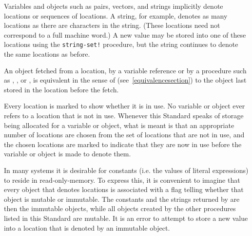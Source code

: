 Variables and objects such as pairs, vectors, and strings implicitly
denote locations or sequences of locations.  A
string, for example, denotes as many locations as there are characters
in the string.  (These locations need not correspond to a full machine
word.) A new value may be stored into one of these locations using the
{\tt string-set!} procedure, but the string continues to denote the
same locations as before.
  
An object fetched from a location, by a variable reference or by
a procedure such as , , or , is
equivalent in the sense of  (see~\ref{equivalencesection})
to the object last stored in the location before the fetch.

Every location is marked to show whether it is in use.
No variable or object ever refers to a location that is not in use.
Whenever this Standard speaks of storage being allocated for a variable
or object, what is meant is that an appropriate number of locations are
chosen from the set of locations that are not in use, and the chosen
locations are marked to indicate that they are now in use before the variable
or object is made to denote them.

In many systems it is desirable for constants (i.e. the values of
literal expressions) to reside in read-only-memory.  To express this, it is
convenient to imagine that every object that denotes locations is associated
with a flag telling whether that object is mutable or
immutable.  The constants and the strings returned by
 are then the immutable objects, while all objects created by
the other procedures listed in this Standard are mutable.  It is an error to
attempt to store a new value into a location that is denoted by an immutable
object.
